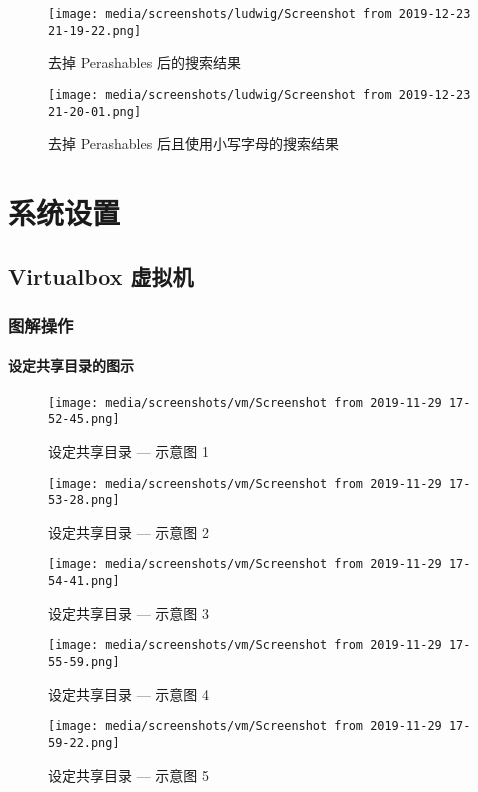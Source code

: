 \documentclass[
    11pt,
    base=hide,
    cite=authoryear,
    device=phone,
    lang=cn,
    mode=simple,
    result=answer,
    toc=onecol,
]{elegantbook_sierxue}
\begin{document}
\begin{figure}[!htbp]
  \centering
  \texttt{[image: media/screenshots/ludwig/Screenshot from 2019-12-23 21-19-22.png]}
  \caption{去掉 Perashables 后的搜索结果}%
  \label{fig:ludwig-result-4}
\end{figure}

\begin{figure}[!htbp]
  \centering
  \texttt{[image: media/screenshots/ludwig/Screenshot from
  2019-12-23 21-20-01.png]}
  \caption{去掉 Perashables 后且使用小写字母的搜索结果}%
  \label{fig:ludwig-result-5}
\end{figure}


%

\appendix

\chapter{系统设置}%
\label{cha:settings-system-a}

\section{Virtualbox 虚拟机}

\subsection{图解操作}%
\label{sub:vbox-graphic-illustration}

\subsubsection{设定共享目录的图示}%
\label{ssub:vbox-set-share-folder-a}

\begin{figure}[!htbp]
  \centering
  \texttt{[image: media/screenshots/vm/Screenshot from 2019-11-29 17-52-45.png]}
  \caption{设定共享目录 --- 示意图 1}
\end{figure}
\begin{figure}[!htbp]
  \centering
  \texttt{[image: media/screenshots/vm/Screenshot from 2019-11-29 17-53-28.png]}
  \caption{设定共享目录 --- 示意图 2}
\end{figure}
\begin{figure}[!htbp]
  \centering
  \texttt{[image: media/screenshots/vm/Screenshot from 2019-11-29 17-54-41.png]}
  \caption{设定共享目录 --- 示意图 3}
\end{figure}
\begin{figure}[!htbp]
  \centering
  \texttt{[image: media/screenshots/vm/Screenshot from 2019-11-29 17-55-59.png]}
  \caption{设定共享目录 --- 示意图 4}
\end{figure}
\begin{figure}[!htbp]
  \centering
  \texttt{[image: media/screenshots/vm/Screenshot from 2019-11-29 17-59-22.png]}
  \caption{设定共享目录 --- 示意图 5}
\end{figure}
\end{document}
